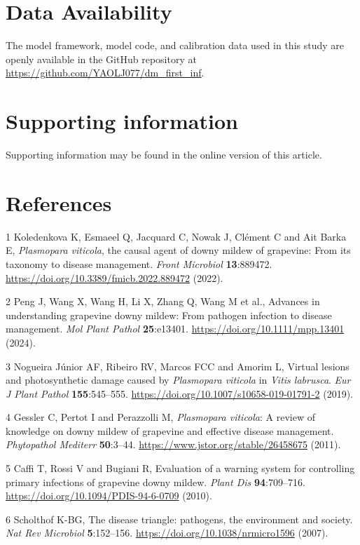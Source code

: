 \documentclass{article}
\begin{document}
\section*{Data Availability}\label{data-availability}

The model framework, model code, and calibration data used in this study
are openly available in the GitHub repository at
\url{https://github.com/YAOLJ077/dm_first_inf}.

\section*{Supporting information}\label{supporting-information}

Supporting information may be found in the online version of this article.

\section*{References}\label{references}

1 Koledenkova K, Esmaeel Q, Jacquard C, Nowak J, Clément C and Ait Barka E, \emph{Plasmopara viticola}, the causal agent of downy mildew of grapevine: From its taxonomy to disease management. \emph{Front Microbiol} \textbf{13}:889472. \url{https://doi.org/10.3389/fmicb.2022.889472} (2022).

2 Peng J, Wang X, Wang H, Li X, Zhang Q, Wang M et al., Advances in understanding grapevine downy mildew: From pathogen infection to disease management. \emph{Mol Plant Pathol} \textbf{25}:e13401. \url{https://doi.org/10.1111/mpp.13401} (2024).

3 Nogueira Júnior AF, Ribeiro RV, Marcos FCC and Amorim L, Virtual lesions and photosynthetic damage caused by \emph{Plasmopara viticola} in \emph{Vitis labrusca}. \emph{Eur J Plant Pathol} \textbf{155}:545--555. \url{https://doi.org/10.1007/s10658-019-01791-2} (2019).

4 Gessler C, Pertot I and Perazzolli M, \emph{Plasmopara viticola}: A review of knowledge on downy mildew of grapevine and effective disease management. \emph{Phytopathol Mediterr} \textbf{50}:3--44. \url{https://www.jstor.org/stable/26458675} (2011).

5 Caffi T, Rossi V and Bugiani R, Evaluation of a warning system for controlling primary infections of grapevine downy mildew. \emph{Plant Dis} \textbf{94}:709--716. \url{https://doi.org/10.1094/PDIS-94-6-0709} (2010).

6 Scholthof K-BG, The disease triangle: pathogens, the environment and society. \emph{Nat Rev Microbiol} \textbf{5}:152--156. \url{https://doi.org/10.1038/nrmicro1596} (2007).
\end{document}
